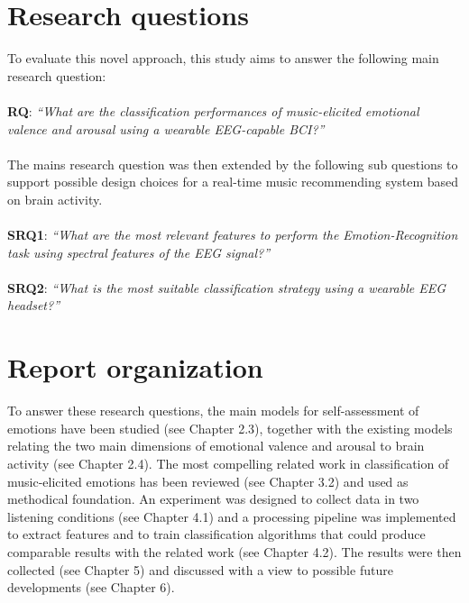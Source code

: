 \section{Research questions}
\label{sec:goal}
To evaluate this novel approach, this study aims to answer the following main research question:
\\
\\
\textbf{RQ}: \emph{ “What are the classification performances of music-elicited emotional valence and arousal using a wearable EEG-capable BCI?”}
\\
\\
The mains research question was then extended by the following sub questions to support possible design choices for a real-time music recommending system based on brain activity.
\\
\\
\textbf{SRQ1}: \emph{“What are the most relevant features to perform the Emotion-Recognition task using spectral features of the EEG signal?”}
\\
\\
\textbf{SRQ2}: \emph{“What is the most suitable classification strategy using a wearable EEG headset?”}



\section{Report organization}
\label{sec:organization}
To answer these research questions, the main models for self-assessment of emotions have been studied (see Chapter 2.3), together with the existing models relating the two main dimensions of emotional valence and arousal to brain activity (see Chapter 2.4). The most compelling related work in classification of music-elicited emotions has been reviewed (see Chapter 3.2) and used as methodical foundation. An experiment was designed to collect data in two listening conditions (see Chapter 4.1) and a processing pipeline was implemented to extract features and to train classification algorithms that could produce comparable results with the related work (see Chapter 4.2). The results were then collected (see Chapter 5) and discussed with a view to possible future developments (see Chapter 6).